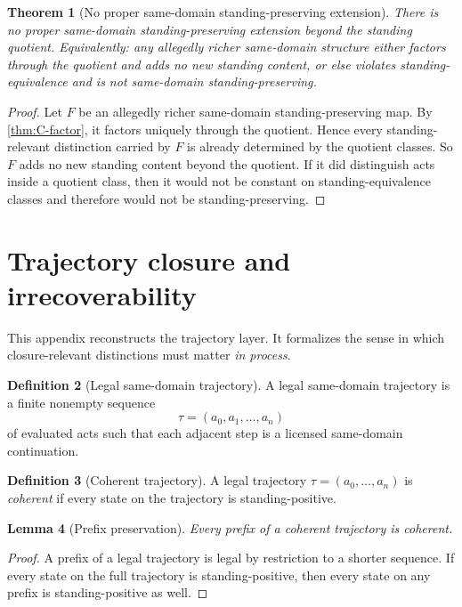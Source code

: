 \documentclass[11pt]{article}
\theoremstyle{plain}
\newtheorem{theorem}{Theorem}[section]
\newtheorem{lemma}[theorem]{Lemma}
\theoremstyle{definition}
\newtheorem{definition}[theorem]{Definition}
\begin{document}
\begin{theorem}[No proper same-domain standing-preserving extension]
\label{thm:C-no-proper-extension}
There is no proper same-domain standing-preserving extension beyond the standing quotient. Equivalently: any allegedly richer same-domain structure either factors through the quotient and adds no new standing content, or else violates standing-equivalence and is not same-domain standing-preserving.
\end{theorem}

\begin{proof}
Let $F$ be an allegedly richer same-domain standing-preserving map. By \cref{thm:C-factor}, it factors uniquely through the quotient. Hence every standing-relevant distinction carried by $F$ is already determined by the quotient classes. So $F$ adds no new standing content beyond the quotient. If it did distinguish acts inside a quotient class, then it would not be constant on standing-equivalence classes and therefore would not be standing-preserving.
\end{proof}

\section{Trajectory closure and irrecoverability}
\label{app:trajectory}

This appendix reconstructs the trajectory layer. It formalizes the sense in which closure-relevant distinctions must matter \emph{in process}.

\begin{definition}[Legal same-domain trajectory]
A legal same-domain trajectory is a finite nonempty sequence
\[
\tau=(a_0,a_1,\dots,a_n)
\]
of evaluated acts such that each adjacent step is a licensed same-domain continuation.
\end{definition}

\begin{definition}[Coherent trajectory]
A legal trajectory $\tau=(a_0,\dots,a_n)$ is \emph{coherent} if every state on the trajectory is standing-positive.
\end{definition}

\begin{lemma}[Prefix preservation]
\label{thm:D-prefix}
Every prefix of a coherent trajectory is coherent.
\end{lemma}

\begin{proof}
A prefix of a legal trajectory is legal by restriction to a shorter sequence. If every state on the full trajectory is standing-positive, then every state on any prefix is standing-positive as well.
\end{proof}
\end{document}
